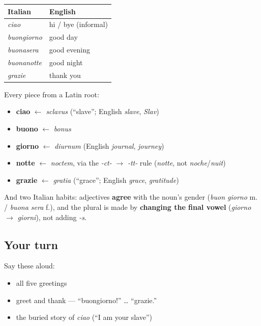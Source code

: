\begin{grammarlens}[title={What you've built — the day of greetings}]
\noindent
\begin{tabularx}{\linewidth}{@{}>{\raggedright\arraybackslash}X>{\raggedright\arraybackslash}X@{}}
\toprule
\textbf{Italian} & \textbf{English} \\
\midrule
\emph{ciao} & hi / bye (informal) \\
\emph{buongiorno} & good day \\
\emph{buonasera} & good evening \\
\emph{buonanotte} & good night \\
\emph{grazie} & thank you \\
\bottomrule
\end{tabularx}

Every piece from a Latin root:

\begin{itemize}
\raggedright
  \item \textbf{ciao} $\leftarrow$ \emph{sclavus} (\textquotedblleft{}slave\textquotedblright{}; English \emph{slave}, \emph{Slav})
  \item \textbf{buono} $\leftarrow$ \emph{bonus}
  \item \textbf{giorno} $\leftarrow$ \emph{diurnum} (English \emph{journal}, \emph{journey})
  \item \textbf{notte} $\leftarrow$ \emph{noctem}, via the \emph{-ct-} $\to$ \emph{-tt-} rule (\emph{notte}, not \emph{noche}/\emph{nuit})
  \item \textbf{grazie} $\leftarrow$ \emph{gratia} (\textquotedblleft{}grace\textquotedblright{}; English \emph{grace}, \emph{gratitude})
\end{itemize}

And two Italian habits: adjectives \textbf{agree} with the noun's gender (\emph{buon giorno} m. / \emph{buona sera} f.), and the plural is made by \textbf{changing the final vowel} (\emph{giorno} $\to$ \emph{giorni}), not adding \emph{-s}.
\end{grammarlens}

\subsection*{Your turn}
Say these aloud:

\begin{itemize}
\raggedright
  \item all five greetings
  \item greet and thank — \textquotedblleft{}buongiorno!\textquotedblright{} … \textquotedblleft{}grazie.\textquotedblright{}
  \item the buried story of \emph{ciao} (\textquotedblleft{}I am your slave\textquotedblright{})
\end{itemize}

